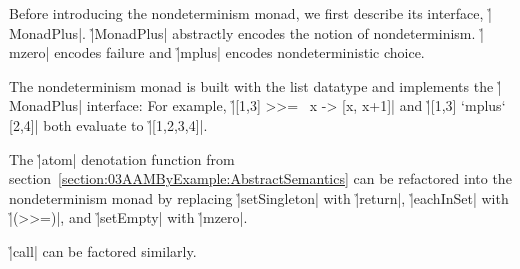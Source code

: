 Before introducing the nondeterminism monad, we first describe its interface,
\h|MonadPlus|.
%
\h|MonadPlus| abstractly encodes the notion of nondeterminism.
%
%
\h|mzero| encodes failure and \h|mplus| encodes nondeterministic choice.


The nondeterminism monad is built with the list datatype
%
%
and implements the \h|MonadPlus| interface:
%
%
For example, \h|[1,3] >>= \ x -> [x, x+1]| and \h|[1,3] `mplus` [2,4]| both
evaluate to \h|[1,2,3,4]|.


The \h|atom| denotation function from
section~\ref{section:03AAMByExample:AbstractSemantics} can be refactored into
the nondeterminism monad by replacing \h|setSingleton| with \h|return|,
\h|eachInSet| with \h|(>>=)|, and \h|setEmpty| with \h|mzero|.
%


\h|call| can be factored similarly.
%
